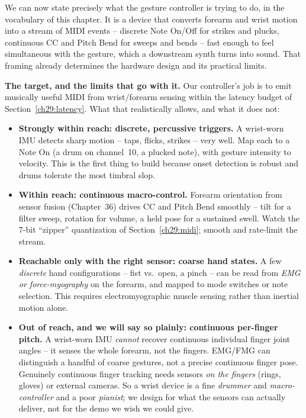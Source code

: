 We can now state precisely what the gesture controller is trying to do, in the vocabulary of this
chapter. It is a device that converts forearm and wrist motion into a stream of MIDI events --
discrete Note On/Off for strikes and plucks, continuous CC and Pitch Bend for sweeps and bends -- fast
enough to feel simultaneous with the gesture, which a downstream synth turns into sound. That framing
already determines the hardware design and its practical limits.

\begin{goalbox}
\textbf{The target, and the limits that go with it.} Our controller's job is to emit musically
useful MIDI from wrist/forearm sensing within the latency budget of Section~\ref{ch29:latency}. What
that realistically allows, and what it does not:
\begin{itemize}
  \item \textbf{Strongly within reach: discrete, percussive triggers.} A wrist-worn IMU detects sharp
    motion -- taps, flicks, strikes -- very well. Map each to a Note On (a drum on channel~10, a
    plucked note), with gesture intensity to velocity. This is the first thing to build because onset
    detection is robust and drums tolerate the most timbral slop.
  \item \textbf{Within reach: continuous macro-control.} Forearm orientation from sensor fusion
    (Chapter~36) drives CC and Pitch Bend smoothly -- tilt for a filter sweep, rotation for volume, a
    held pose for a sustained swell. Watch the 7-bit ``zipper'' quantization of
    Section~\ref{ch29:midi}; smooth and rate-limit the stream.
  \item \textbf{Reachable only with the right sensor: coarse hand states.} A few \emph{discrete} hand
    configurations -- fist vs.\ open, a pinch -- can be read from \emph{EMG or force-myography} on the
    forearm, and mapped to mode switches or note selection. This requires electromyographic
    muscle sensing rather than inertial motion alone.
  \item \textbf{Out of reach, and we will say so plainly: continuous per-finger pitch.} A wrist-worn
    IMU \emph{cannot} recover continuous individual finger joint angles -- it senses the whole forearm,
    not the fingers. EMG/FMG can distinguish a handful of coarse gestures, not a precise continuous
    finger pose. Genuinely continuous finger tracking needs sensors \emph{on the fingers} (rings,
    gloves) or external cameras. So a wrist device is a fine \emph{drummer} and \emph{macro-controller}
    and a poor \emph{pianist}; we design for what the sensors can actually deliver, not for the demo we
    wish we could give.
\end{itemize}
\end{goalbox}

